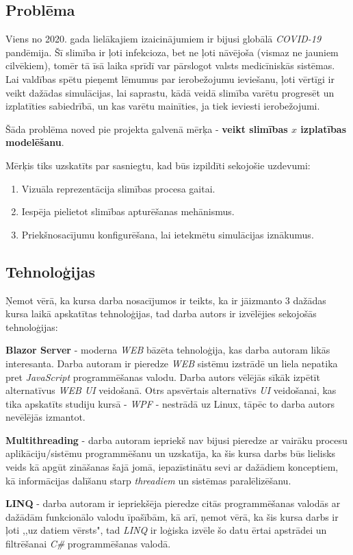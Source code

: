 
\subsection{Problēma}

Viens no 2020. gada lielākajiem izaicinājumiem ir bijusi globālā \emph{COVID-19} pandēmija.
Šī slimība ir ļoti infekcioza\cite{covid:contagious}, bet ne ļoti nāvējoša (vismaz ne jauniem cilvēkiem), tomēr
tā īsā laika sprīdī var pārslogot valsts medicīniskās sistēmas\cite{covid:medical-system-strain}. Lai valdības spētu
pieņemt lēmumus par ierobežojumu ieviešanu, ļoti vērtīgi ir veikt dažādas simulācijas,
lai saprastu, kādā veidā slimība varētu progresēt un izplatīties sabiedrībā, un kas
varētu mainīties, ja tiek ieviesti ierobežojumi.

Šāda problēma noved pie projekta galvenā mērķa - \textbf{veikt slimības \(x\) izplatības modelēšanu}.

Mērķis tiks uzskatīts par sasniegtu, kad būs izpildīti sekojošie uzdevumi:

\begin{enumerate}
    \item Vizuāla reprezentācija slimības procesa gaitai.
    \item Iespēja pielietot slimības apturēšanas mehānismus.
    \item Priekšnosacījumu konfigurēšana, lai ietekmētu simulācijas iznākumus.
\end{enumerate}

\subsection{Tehnoloģijas}

Ņemot vērā, ka kursa darba nosacījumos ir teikts, ka ir jāizmanto 3 dažādas kursa
laikā apskatītas tehnoloģijas, tad darba autors ir izvēlējies sekojošās tehnoloģijas:

\textbf{Blazor Server}\cite{blazor:info} - moderna \emph{WEB} bāzēta tehnoloģija, kas darba autoram likās interesanta.
Darba autoram ir pieredze \emph{WEB} sistēmu izstrādē un liela nepatika
pret \emph{JavaScript} programmēšanas valodu. Darba autors vēlējās sīkāk izpētīt
alternatīvus \emph{WEB UI} veidošanā. Otrs apsvērtais
alternatīvs \emph{UI} veidošanai, kas tika apskatīts studiju kursā - \emph{WPF}\cite{wpf:info} - nestrādā uz
Linux, tāpēc to darba autors nevēlējās izmantot.

\textbf{Multithreading} - darba autoram iepriekš nav bijusi pieredze ar vairāku procesu
aplikāciju/sistēmu programmēšanu un uzskatīja, ka šis kursa darbs būs lielisks
veids kā apgūt zināšanas šajā jomā, iepazīstinātu sevi ar dažādiem konceptiem, kā
informācijas dalīšanu starp \emph{threadiem} un sistēmas paralēlizēšanu.

\textbf{LINQ}\cite{linq:info} - darba autoram ir iepriekšēja pieredze citās programmēšanas
valodās ar dažādām funkcionālo valodu īpašībām, kā arī, ņemot vērā, ka šis
kursa darbs ir ļoti ,,uz datiem vērsts", tad \emph{LINQ} ir loģiska izvēle šo datu
ērtai apstrādei un filtrēšanai \emph{C\#} programmēšanas valodā.
